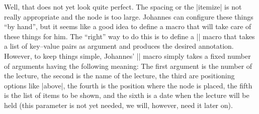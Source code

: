 Well, that does not yet look quite perfect. The spacing or the |{itemize}| is
not really appropriate and the node is too large. Johannes can configure these
things ``by hand'', but it seems like a good idea to define a macro that will
take care of these things for him. The ``right'' way to do this is to define a
|\lecture| macro that takes a list of key--value pairs as argument and produces
the desired annotation. However, to keep things simple, Johannes' |\lecture|
macro simply takes a fixed number of arguments having the following meaning:
The first argument is the number of the lecture, the second is the name of the
lecture, the third are positioning options like |above|, the fourth is the
position where the node is placed, the fifth is the list of items to be shown,
and the sixth is a date when the lecture will be held (this parameter is not
yet needed, we will, however, need it later on).
%
\begin{codeexample}
\def\lecture#1#2#3#4#5#6{
  \node [annotation, #3, scale=0.65, text width=4cm, inner sep=2mm] at (#4) {
    Lecture #1: \textcolor{orange}{\textbf{#2}}
    \list{--}{\topsep=2pt\itemsep=0pt\parsep=0pt
              \parskip=0pt\labelwidth=8pt\leftmargin=8pt
              \itemindent=0pt\labelsep=2pt}
    #5
    \endlist
  };
}
\end{codeexample}
\def\lecture#1#2#3#4#5#6{
  \node [annotation, #3, scale=0.65, text width=4cm, inner sep=2mm] at (#4) {
    Lecture #1: \textcolor{orange}{\textbf{#2}}
    \list{--}{\topsep=2pt\itemsep=0pt\parsep=0pt
              \parskip=0pt\labelwidth=8pt\leftmargin=8pt
              \itemindent=0pt\labelsep=2pt}
    #5
    \endlist
  };
}


